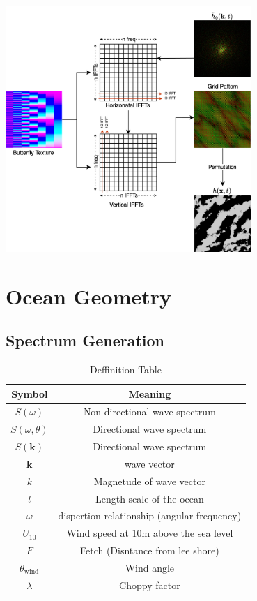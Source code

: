 \begin{minipage}{1\textwidth}
    \centering
    \includegraphics[width=0.7\textwidth]{"images/ifft_algorithm.png"}
    \label{fig:ifft_algorithm}
\end{minipage}

\section{Ocean Geometry}
\subsection{Spectrum Generation}

\begin{table}[H]
    \centering
    \begin{tabular}{|c|c|}
        \hline
        \textbf{Symbol} & \textbf{Meaning} \\
        \hline
        $S(\omega)$ & Non directional wave spectrum \\
        $S(\omega, \theta)$ & Directional wave spectrum\\
        $S(\mathbf{k})$ & Directional wave spectrum\\
        $\mathbf{k}$ & wave vector \\
        $k$ & Magnetude of wave vector\\
        $l$ & Length scale of the ocean\\
        $\omega$ & dispertion relationship (angular frequency)\\
        $U_{10}$ & Wind speed at 10m above the sea level\\
        $F$ & Fetch (Disntance from lee shore)\\
        $\theta_{\text{wind}}$ & Wind angle\\
        $\lambda$ & Choppy factor\\
        \hline
    \end{tabular}
    \caption{Deffinition Table}
    \label{table:deffinition_table}
\end{table}

